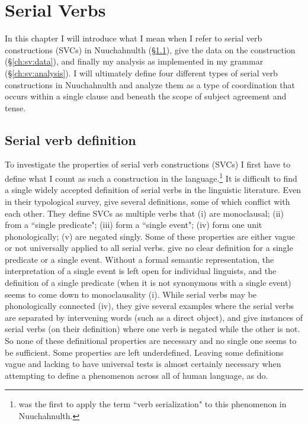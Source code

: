 \chapter{Serial Verbs} \label{ch:sv}

In this chapter I will introduce what I mean when I refer to serial verb constructions (SVCs) in \mbox{Nuuchahnulth} (\S\ref{ch:sv:def}), give the data on the construction (\S\ref{ch:sv:data}), and finally my analysis as implemented in my grammar (\S\ref{ch:sv:analysis}). I will ultimately define four different types of serial verb constructions in Nuuchahnulth and analyze them as a type of coordination that occurs within a single clause and beneath the scope of subject agreement and tense.

\section{Serial verb definition} \label{ch:sv:def}

To investigate the properties of serial verb constructions (SVCs) I first have to define what I count as such a construction in the language.\footnote{\citet{jacobsen1993} was the first to apply the term ``verb serialization" to this phenomenon in Nuuchahnulth.}  It is difficult to find a single widely accepted definition of serial verbs in the linguistic literature. Even in their typological survey, \citet{aikhenvalddixon2006} give several definitions, some of which conflict with each other. They define SVCs as multiple verbs that (i) are monoclausal; (ii) from a ``single predicate"; (iii) form a ``single event"; (iv) form one unit phonologically; (v) are negated singly. Some of these properties are either vague or not universally applied to all serial verbs. \citeauthor{aikhenvalddixon2006} give no clear definition for a single predicate or a single event. Without a formal semantic representation, the interpretation of a single event is left open for individual linguists, and the definition of a single predicate (when it is not synonymous with a single event) seems to come down to monoclausality (i). While serial verbs may be phonologically connected (iv), they give several examples where the serial verbs are separated by intervening words (such as a direct object), and give instances of serial verbs (on their definition) where one verb is negated while the other is not. So none of these definitional properties are necessary and no single one seems to be sufficient. Some properties are left underdefined. Leaving some definitions vague and lacking to have universal tests is almost certainly necessary when attempting to define a phenomenon across all of human language, as \citeauthor{aikhenvalddixon2006} do.

